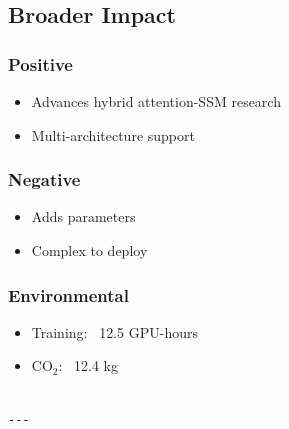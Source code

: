 \subsection{Broader Impact}

\subsubsection{Positive}
\begin{itemize}
\item Advances hybrid attention-SSM research
\item Multi-architecture support

\end{itemize}
\subsubsection{Negative}
\begin{itemize}
\item Adds parameters
\item Complex to deploy

\end{itemize}
\subsubsection{Environmental}
\begin{itemize}
\item Training: ~12.5 GPU-hours
\item CO$_2$: ~12.4 kg
\end{itemize}
\begin{lstlisting}

---
\end{lstlisting}